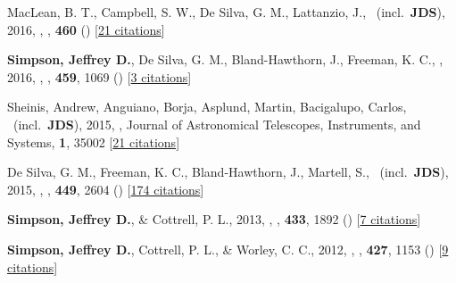 \item[{\color{numcolor}\scriptsize6}] MacLean, B. T., Campbell, S. W., De Silva, G. M., Lattanzio, J., \etal\ (incl.\ \textbf{JDS}), 2016, , \mnras, \textbf{460} () [\href{http://adsabs.harvard.edu/abs/2016MNRAS.460L..69M}{21 citations}]

\item[{\color{numcolor}\scriptsize5}] \textbf{Simpson, Jeffrey D.}, De Silva, G. M., Bland-Hawthorn, J., Freeman, K. C., \etal, 2016, , \mnras, \textbf{459}, 1069 () [\href{http://adsabs.harvard.edu/abs/2016MNRAS.459.1069S}{3 citations}]

\item[{\color{numcolor}\scriptsize4}] Sheinis, Andrew, Anguiano, Borja, Asplund, Martin, Bacigalupo, Carlos, \etal\ (incl.\ \textbf{JDS}), 2015, , Journal of Astronomical Telescopes, Instruments, and Systems, \textbf{1}, 35002 [\href{http://adsabs.harvard.edu/abs/2015JATIS...1c5002S}{21 citations}]

\item[{\color{numcolor}\scriptsize3}] De Silva, G. M., Freeman, K. C., Bland-Hawthorn, J., Martell, S., \etal\ (incl.\ \textbf{JDS}), 2015, , \mnras, \textbf{449}, 2604 () [\href{http://adsabs.harvard.edu/abs/2015MNRAS.449.2604D}{174 citations}]

\item[{\color{numcolor}\scriptsize2}] \textbf{Simpson, Jeffrey D.}, \& Cottrell, P. L., 2013, , \mnras, \textbf{433}, 1892 () [\href{http://adsabs.harvard.edu/abs/2013MNRAS.433.1892S}{7 citations}]

\item[{\color{numcolor}\scriptsize1}] \textbf{Simpson, Jeffrey D.}, Cottrell, P. L., \& Worley, C. C., 2012, , \mnras, \textbf{427}, 1153 () [\href{http://adsabs.harvard.edu/abs/2012MNRAS.427.1153S}{9 citations}]